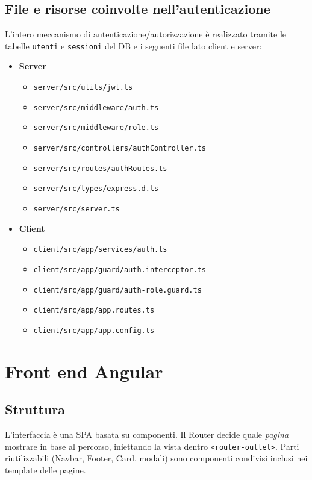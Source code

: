 \documentclass[12pt,a4paper]{article}
\begin{document}
\subsection*{File e risorse coinvolte nell'autenticazione}
L'intero meccanismo di autenticazione/autorizzazione è realizzato tramite le tabelle \texttt{utenti} e \texttt{sessioni} del DB e i seguenti file lato client e server:
\begin{itemize}[noitemsep]
	\item \textbf{Server}
	\begin{itemize}[noitemsep]
		\item \texttt{server/src/utils/jwt.ts}
		\item \texttt{server/src/middleware/auth.ts}
		\item \texttt{server/src/middleware/role.ts}
		\item \texttt{server/src/controllers/authController.ts}
		\item \texttt{server/src/routes/authRoutes.ts}
		\item \texttt{server/src/types/express.d.ts}
		\item \texttt{server/src/server.ts}
	\end{itemize}
	\item \textbf{Client}
	\begin{itemize}[noitemsep]
		\item \texttt{client/src/app/services/auth.ts}
		\item \texttt{client/src/app/guard/auth.interceptor.ts}
		\item \texttt{client/src/app/guard/auth-role.guard.ts}
		\item \texttt{client/src/app/app.routes.ts}
		\item \texttt{client/src/app/app.config.ts}
	\end{itemize}
\end{itemize}

\section{Front end Angular}
\subsection{Struttura}
L'interfaccia è una SPA basata su componenti. Il Router decide quale \emph{pagina} mostrare in base al percorso, iniettando la vista dentro \texttt{<router-outlet>}. Parti riutilizzabili (Navbar, Footer, Card, modali) sono componenti condivisi inclusi nei template delle pagine.
\end{document}
